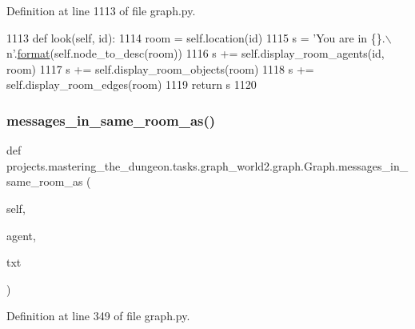 Definition at line 1113 of file graph.\+py.


\begin{DoxyCode}
1113     \textcolor{keyword}{def }look(self, id):
1114         room = self.location(id)
1115         s = \textcolor{stringliteral}{'You are in \{\}.\(\backslash\)n'}.\hyperlink{namespaceparlai_1_1chat__service_1_1services_1_1messenger_1_1shared__utils_a32e2e2022b824fbaf80c747160b52a76}{format}(self.node\_to\_desc(room))
1116         s += self.display\_room\_agents(id, room)
1117         s += self.display\_room\_objects(room)
1118         s += self.display\_room\_edges(room)
1119         \textcolor{keywordflow}{return} s
1120 
\end{DoxyCode}
\mbox{\label{classprojects_1_1mastering__the__dungeon_1_1tasks_1_1graph__world2_1_1graph_1_1Graph_acf7515b326c420223c184330ae8dbff4}} 
\subsubsection{\texorpdfstring{messages\+\_\+in\+\_\+same\+\_\+room\+\_\+as()}{messages\_in\_same\_room\_as()}}
{\footnotesize\ttfamily def projects.\+mastering\+\_\+the\+\_\+dungeon.\+tasks.\+graph\+\_\+world2.\+graph.\+Graph.\+messages\+\_\+in\+\_\+same\+\_\+room\+\_\+as (\begin{DoxyParamCaption}\item[{}]{self,  }\item[{}]{agent,  }\item[{}]{txt }\end{DoxyParamCaption})}



Definition at line 349 of file graph.\+py.



